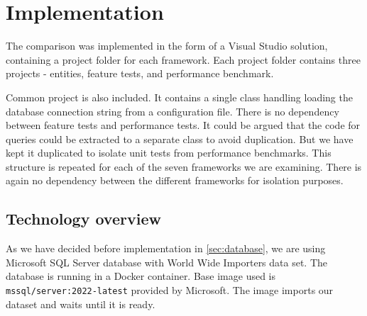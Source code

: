 \section{Implementation}
The comparison was implemented in the form of a Visual Studio solution, containing a project folder for each framework. Each project folder contains three projects - entities, feature tests, and performance benchmark. 


\usetikzlibrary{positioning, arrows}
\begin{center}
\end{center}

Common project is also included. It contains a single class handling loading the database connection string from a configuration file. There is no dependency between feature tests and performance tests. It could be argued that the code for queries could be extracted to a separate class to avoid duplication. But we have kept it duplicated to isolate unit tests from performance benchmarks. This structure is repeated for each of the seven frameworks we are examining. There is again no dependency between the different frameworks for isolation purposes.

\subsection{Technology overview}
As we have decided before implementation in \autoref{sec:database}, we are using Microsoft SQL Server database with World Wide Importers data set. The database is running in a Docker container. Base image used is \texttt{mssql/server:2022-latest}\cite{mssqlDocker} provided by Microsoft. The image imports our dataset and waits until it is ready.

